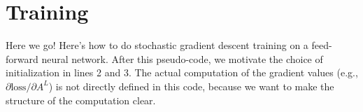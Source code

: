 



\section{Training}
Here we go!  Here's how to do stochastic gradient descent training on
a feed-forward neural network.   After this pseudo-code, we motivate
the choice of initialization in lines 2 and 3.  The actual
computation of the gradient values (e.g., $\partial\text{loss}/
  \partial A^L$) is not directly defined in this code, because we want
to make the structure of the computation clear.

